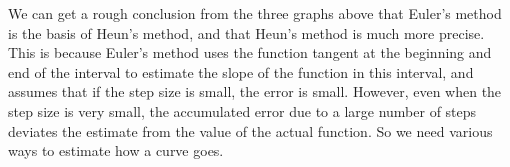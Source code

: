 \documentclass[12pt]{article}
\begin{document}
We can get a rough conclusion from the three graphs above that Euler's method is the basis of Heun's method, and that Heun's method is much more precise. This is because Euler's method uses the function tangent at the beginning and end of the interval to estimate the slope of the function in this interval, and assumes that if the step size is small, the error is small. However, even when the step size is very small, the accumulated error due to a large number of steps deviates the estimate from the value of the actual function. So we need various ways to estimate how a curve goes. 



\begin{thebibliography}{9}


\end{thebibliography}

\end{document}
